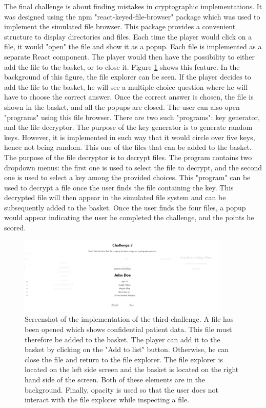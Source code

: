 \documentclass{l4proj}
\begin{document}
The final challenge is about finding mistakes in cryptographic implementations.
It was designed using the npm "react-keyed-file-browser" package which was used to implement the simulated file browser.
This package provides a convenient structure to display directories and files.
Each time the player would click on a file, it would "open" the file and show it as a popup.
Each file is implemented as a separate React component.
The player would then have the possibility to either add the file to the basket, or to close it.
Figure \ref{fig:Challenge3Imp} shows this feature. 
In the background of this figure, the file explorer can be seen. 
If the player decides to add the file to the basket, 
he will see a multiple choice question where he will have to choose the correct answer.
Once the correct answer is chosen, the file is shown in the basket, and all the popups are closed.
The user can also open "programs" using this file browser.
There are two such "programs": key generator, and the file decryptor.
The purpose of the key generator is to generate random keys.
However, it is implemented in such way that it would circle over five keys, 
hence not being random. This one of the files that can be added to the basket.
The purpose of the file decryptor is to decrypt files. 
The program contains two dropdown menus: the first one is used to select the file to decrypt,
and the second one is used to select a key among the provided choices. 
This "program" can be used to decrypt a file once the user finds the file containing the key.
This decrypted file will then appear in the simulated file system and can be subsequently added to the basket.
Once the user finds the four files, a popup would appear indicating the user he completed the challenge, and the points he scored.

\begin{figure}[]
    \centering
    \includegraphics[width=0.9\textwidth, frame]{images/Challenge3Imp.PNG}
    \caption{Screenshot of the implementation of the third challenge. 
    A file has been opened which shows confidential patient data.
    This file must therefore be added to the basket.
    The player can add it to the basket by clicking on the "Add to list" button.
    Otherwise, he can close the file and return to the file explorer.
    The file explorer is located on the left side screen 
    and the basket is located on the right hand side of the screen.
    Both of these elements are in the background. 
    Finally, opacity is used so that the user does not interact 
    with the file explorer while inspecting a file.}
    \label{fig:Challenge3Imp}
\end{figure}
\end{document}
